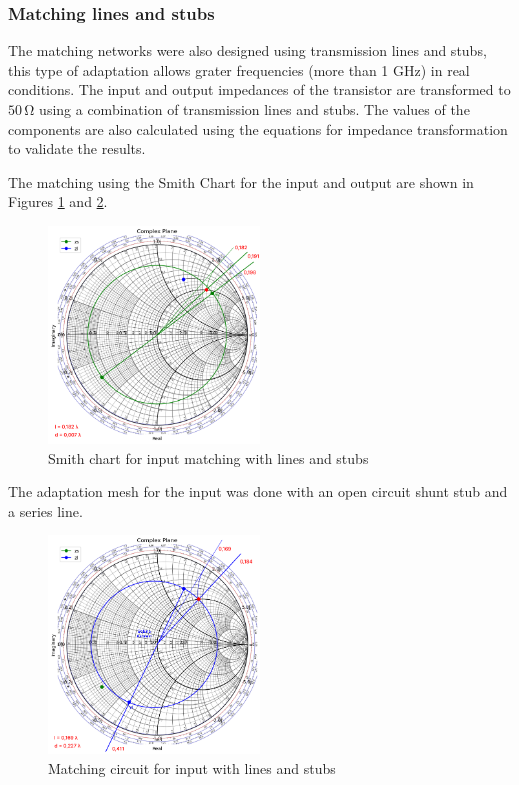 \subsubsection{Matching lines and stubs}
The matching networks were also designed using transmission lines and stubs, this type of adaptation allows grater frequencies (more than 1 \si{\giga \hertz}) in real conditions. The input and output impedances of the transistor are transformed to $50\,\si{\ohm}$ using a combination of transmission lines and stubs. The values of the components are also calculated using the equations for impedance transformation to validate the results.

The matching using the Smith Chart for the input and output are shown in Figures \ref{fig:zs-line-matching} and \ref{fig:zl-line-matching}.

\begin{figure}[H]
    \centering
    \includegraphics[width=0.5\textwidth]{Images/zs-LS-matching.png}
    \caption{Smith chart for input matching with lines and stubs}
    \label{fig:zs-line-matching}
\end{figure}

The adaptation mesh for the input was done with an open circuit shunt stub and a series line. 

\begin{figure}[H]
    \centering
    \includegraphics[width=0.5\textwidth]{Images/zl-LS-matching.png}
    \caption{Matching circuit for input with lines and stubs}
    \label{fig:zl-line-matching}
\end{figure}

